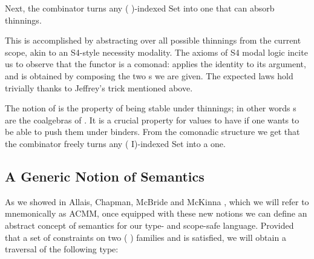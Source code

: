 Next, the  combinator turns any ( )-indexed Set into one that can
absorb thinnings.
\begin{center}
\begin{minipage}{0.45\textwidth}
\end{minipage}\hfill
\begin{minipage}{0.45\textwidth}
\end{minipage}

\begin{minipage}{0.25\textwidth}
\end{minipage}\hfill
\begin{minipage}{0.35\textwidth}
\end{minipage}\hfill
\begin{minipage}{0.30\textwidth}
\end{minipage}

\end{center}
This is accomplished by abstracting over all possible thinnings
from the current scope, akin to an S4-style necessity modality. The axioms of S4
modal logic incite us to observe that the functor  is a comonad: 
applies the identity  to its argument, and  is obtained
by composing the two s we are given. The expected laws hold trivially
thanks to Jeffrey's trick mentioned above.

The notion of  is the property of being stable under thinnings;
in other words s are the coalgebras of .
It is a crucial property for values to have if one wants to be able to push
them under binders. From the comonadic structure we get that
the  combinator freely turns any ( I)-indexed Set into a
 one.

\subsection{A Generic Notion of Semantics}

As we showed in Allais, Chapman, McBride and McKinna
\citeyear{allais2017type}, which we will refer to mnemonically as
ACMM, once equipped with these new notions we can define an abstract
concept of semantics for our type- and scope-safe language. Provided
that a set of constraints on two ({ }) families
 and  is satisfied, we will obtain a traversal of the
following type:

